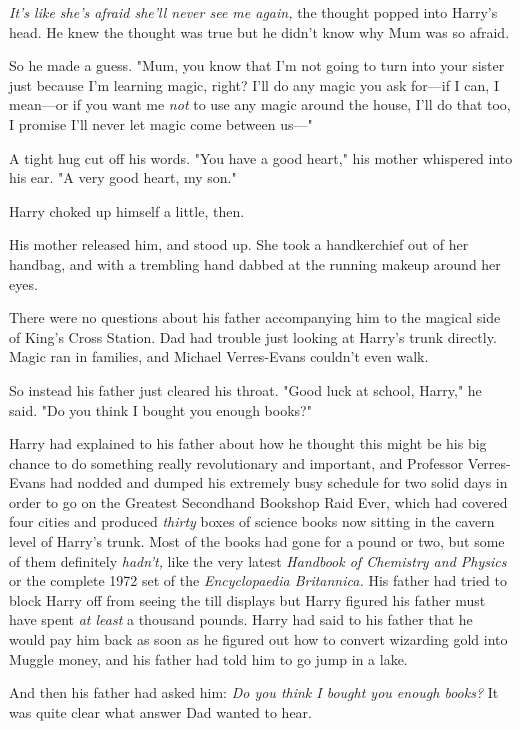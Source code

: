 \emph{It's like she's afraid she'll never see me again,} the thought popped 
into Harry's head. He knew the thought was true but he didn't know why Mum was 
so afraid.

So he made a guess. "Mum, you know that I'm not going to turn into your sister 
just because I'm learning magic, right? I'll do any magic you ask for---if I 
can, I mean---or if you want me \emph{not} to use any magic around the house, 
I'll do that too, I promise I'll never let magic come between us---"

A tight hug cut off his words. "You have a good heart," his mother whispered 
into his ear. "A very good heart, my son."

Harry choked up himself a little, then.

His mother released him, and stood up. She took a handkerchief out of her 
handbag, and with a trembling hand dabbed at the running makeup around her eyes.

There were no questions about his father accompanying him to the magical side 
of King's Cross Station. Dad had trouble just looking at Harry's trunk 
directly. Magic ran in families, and Michael Verres-Evans couldn't even walk.

So instead his father just cleared his throat. "Good luck at school, Harry," he 
said. "Do you think I bought you enough books?"

Harry had explained to his father about how he thought this might be his big 
chance to do something really revolutionary and important, and Professor 
Verres-Evans had nodded and dumped his extremely busy schedule for two solid 
days in order to go on the Greatest Secondhand Bookshop Raid Ever, which had 
covered four cities and produced \emph{thirty} boxes of science books now 
sitting in the cavern level of Harry's trunk. Most of the books had gone for a 
pound or two, but some of them definitely \emph{hadn't,} like the very latest 
\emph{Handbook of Chemistry and Physics} or the complete 1972 set of the 
\emph{Encyclopaedia Britannica.} His father had tried to block Harry off from 
seeing the till displays but Harry figured his father must have spent \emph{at 
least} a thousand pounds. Harry had said to his father that he would pay him 
back as soon as he figured out how to convert wizarding gold into Muggle money, 
and his father had told him to go jump in a lake.

And then his father had asked him: \emph{Do you think I bought you enough 
books?} It was quite clear what answer Dad wanted to hear.

